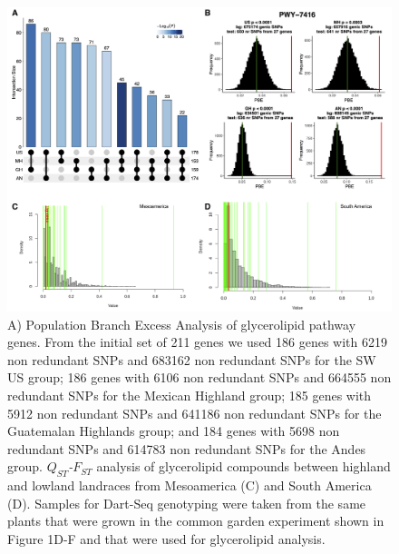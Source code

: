 \documentclass[9pt,twocolumn,twoside,lineno]{gsajnl}
\begin{document}
\begin{figure}[t]
\begin{center}
\includegraphics[width=0.8\paperwidth]{Sup_Figures/Sup_Fig_1.png}
\caption{A) Population Branch Excess Analysis of glycerolipid pathway genes.
From the initial set of 211 genes we used 186 genes with 6219 non redundant SNPs and 683162 non redundant SNPs for the SW US group; 186 genes with 6106 non redundant SNPs and 664555 non redundant SNPs for the Mexican Highland group;
185 genes with 5912 non redundant SNPs and 641186 non redundant SNPs for the Guatemalan Highlands group; and 184 genes with 5698 non redundant SNPs and 614783 non redundant SNPs for the Andes group.    
\textit{$Q_{ST}$-$F_{ST}$} analysis of glycerolipid compounds between highland and lowland landraces from Mesoamerica (C) and South America (D).
Samples for Dart-Seq genotyping were taken from the same plants that were grown in the common garden experiment shown in Figure 1D-F and that were used for glycerolipid analysis. 
}
\label{SupFig1}
\end{center}
\end{figure} 
\end{document}
